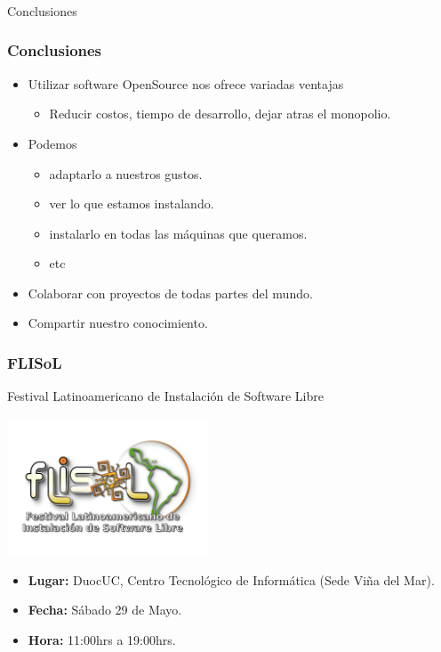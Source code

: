 \frame
{
\frametitle{}
\begin{center}
	\Huge{Conclusiones}
\end{center}
}

\frame
{
\frametitle{Conclusiones}
\begin{itemize}
	\item Utilizar software OpenSource nos ofrece variadas ventajas
	\begin{itemize}
		\item Reducir costos, tiempo de desarrollo, dejar atras el monopolio.
	\end{itemize}
	\item Podemos
	\begin{itemize}
		\item adaptarlo a nuestros gustos.
		\item ver lo que estamos instalando.
		\item instalarlo en todas las máquinas que queramos.
		\item etc
	\end{itemize}
	\item Colaborar con proyectos de todas partes del mundo.
	\item Compartir nuestro conocimiento.
\end{itemize}
}

\frame
{
\frametitle{FLISoL}
\Large{Festival Latinoamericano de Instalación de Software Libre}
\normalsize
\begin{center}
	\includegraphics[width=6cm]{img/flisol}
\end{center}
\begin{itemize}
	\item {\bf Lugar:} DuocUC, Centro Tecnológico de Informática (Sede Viña del Mar).
	\item {\bf Fecha:} Sábado 29 de Mayo.
	\item {\bf Hora: } 11:00hrs a 19:00hrs.
\end{itemize}
}
